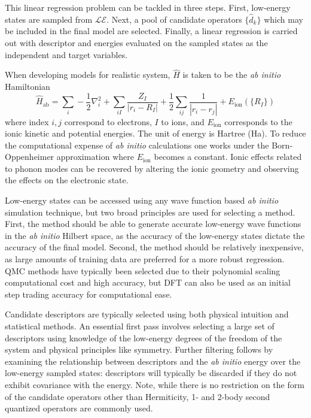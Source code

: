 \documentclass[12pt]{article}
\begin{document}
This linear regression problem can be tackled in three steps.
First, low-energy states are sampled from $\mathcal{LE}$.
Next, a pool of candidate operators $\{\hat{d}_k\}$ which may be included in the final model are selected.
Finally, a linear regression is carried out with descriptor and energies evaluated on the sampled states as the independent and target variables.

When developing models for realistic system, $\hat{H}$ is taken to be the \textit{ab initio} Hamiltonian
\begin{equation}
\hat{H}_\text{ab} = \sum_i -\frac{1}{2} \nabla_i^2 + \sum_{iI}\frac{Z_I}{|r_i - R_I|} + \frac{1}{2} \sum_{ij} \frac{1}{|r_i - r_j|} + E_\text{ion}(\{R_I\})  
\label{eq:Hab}
\end{equation} 
where index $i,j$ correspond to electrons, $I$ to ions, and $E_\text{ion}$ corresponds to the ionic kinetic and potential energies. 
The unit of energy is Hartree (Ha).
To reduce the computational expense of \textit{ab initio} calculations one works under the Born-Oppenheimer approximation where $E_\text{ion}$ becomes a constant.
Ionic effects related to phonon modes can be recovered by altering the ionic geometry and observing the effects on the electronic state.

Low-energy states can be accessed using any wave function based \textit{ab initio} simulation technique, but two broad principles are used for selecting a method.
First, the method should be able to generate accurate low-energy wave functions in the \textit{ab initio} Hilbert space, as the accuracy of the low-energy states dictate the accuracy of the final model.
Second, the method should be relatively inexpensive, as large amounts of training data are preferred for a more robust regression.
QMC methods have typically been selected due to their polynomial scaling computational cost and high accuracy, but DFT can also be used as an initial step trading accuracy for computational ease.

Candidate descriptors are typically selected using both physical intuition and statistical methods.
An essential first pass involves selecting a large set of descriptors using knowledge of the low-energy degrees of the freedom of the system and physical principles like symmetry.
Further filtering follows by examining the relationship between descriptors and the \textit{ab initio} energy over the low-energy sampled states: descriptors will typically be discarded if they do not exhibit covariance with the energy.
Note, while there is no restriction on the form of the candidate operators other than Hermiticity, 1- and 2-body second quantized operators are commonly used.
\end{document}
